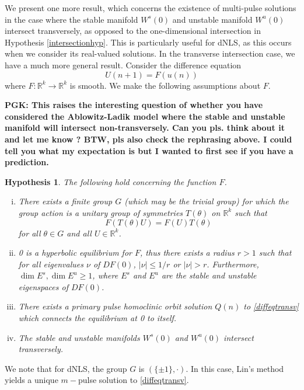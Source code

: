 \documentclass[12pt]{article}
\def\R{{\mathbb R}}
\newtheorem{hypothesis}{Hypothesis}
\begin{document}
We present one more result, which concerns the existence of multi-pulse solutions in the case where the stable manifold $W^s(0)$ and unstable manifold $W^u(0)$ intersect transversely, as opposed to the one-dimensional intersection in Hypothesis \ref{intersectionhyp}. This is particularly useful for dNLS, as this occurs when we consider its real-valued solutions. In the transverse intersection case, we have a much more general result. Consider the difference equation
\begin{equation}\label{diffeqtransv}
U(n+1) = F(u(n))
\end{equation}
where $F: \R^k \rightarrow \R^k$ is smooth. We make the following assumptions about $F$.

{\bf PGK: This raises the interesting question 
of whether you have considered the Ablowitz-Ladik
model where the stable and unstable manifold will intersect non-transversely. Can you pls. think about it and let me know ? BTW, pls also check the rephrasing above. I could
tell you what my expectation is but I wanted to first
see if you have a prediction.}


\begin{hypothesis}\label{transversehyp}
The following hold concerning the function $F$.
\begin{enumerate}[(i)]
\item There exists a finite group $G$ (which may be the trivial group) for which the group action is a unitary group of symmetries $T(\theta)$ on $\R^k$ such that 
\begin{equation}\label{symmetrytransverse}
F(T(\theta)U) = F(U)T(\theta)
\end{equation}
for all $\theta \in G$ and all $U \in \R^k$. 
\item 0 is a hyperbolic equilibrium for $F$, thus there exists a radius $r > 1$ such that for all eigenvalues $\nu$ of $DF(0)$, $|\nu| \leq 1/r$ or $|\nu| > r$. Furthermore, $\dim E^s, \dim E^u \geq 1$, where $E^s$ and $E^u$ are the stable and unstable eigenspaces of $DF(0)$.
\item There exists a primary pulse homoclinic orbit solution $Q(n)$ to \eqref{diffeqtransv} which connects the equilibrium at 0 to itself.
\item The stable and unstable manifolds $W^s(0)$ and $W^u(0)$ intersect transversely.
\end{enumerate}
\end{hypothesis}
We note that for dNLS, the group $G$ is $( \{\pm 1\}, \cdot)$. In this case, Lin's method yields a unique $m-$pulse solution to \eqref{diffeqtransv}.
\end{document}
